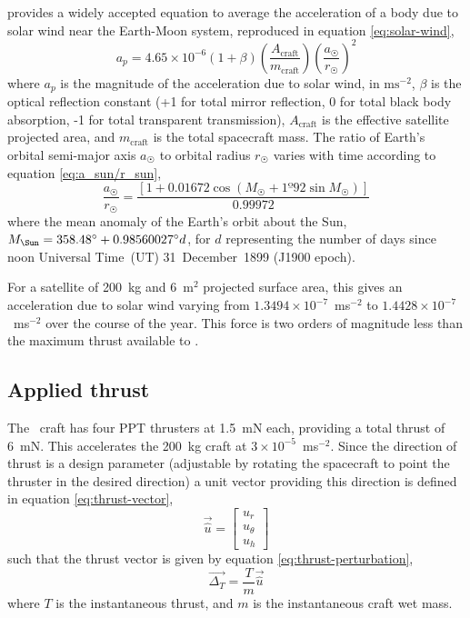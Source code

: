 \textcite[p. 223]{Chobotov2002} provides a widely accepted equation to average the acceleration
 of a body due to solar wind near the Earth-Moon system, reproduced in equation \eqref{eq:solar-wind},
\begin{equation}\label{eq:solar-wind}
a_{p}=4.65\times10^{-6}(1+\beta)\left(\frac{A_{\text{craft}}}{m_{\text{craft}}}\right)\left(\frac{a_\Sun}{r_\Sun}\right)^{2}
\end{equation}
where $a_{p}$ is the magnitude of the acceleration due to solar wind, in $\text{ms}^{-2}$, $\beta$ is the optical reflection constant (+1 for total mirror reflection, 0 for total black body absorption, -1 for total transparent transmission), $A_{\text{craft}}$ is the effective satellite projected area, and $m_{\text{craft}}$ is the total spacecraft mass. The ratio of Earth's orbital semi-major axis $a_\Sun$ to orbital radius $r_\Sun$ varies with time according to equation \eqref{eq:a_sun/r_sun},
\begin{equation}\label{eq:a_sun/r_sun}
\frac{a_\Sun}{r_\Sun}=\frac{[1+0.01672\cos(M_\Sun+1º92\sin M_\Sun)]}{0.99972}
\end{equation}
where the mean anomaly of the Earth's orbit about the Sun, $M_\Sun=358.48\degrees+0.98560027\degrees d$, for $d$ representing the number of days since noon Universal Time~(UT) 31~December~1899 (J1900 epoch).

For a satellite of 200~kg and 6~m$^2$ projected surface area, this gives an acceleration due to solar wind varying from $1.3494\times10^{-7}$~ms$^{-2}$ to $1.4428\times10^{-7}$~ms$^{-2}$ over the course of the year. This force is two orders of magnitude less than the maximum thrust available to \BW.




\subsection{Applied thrust} \label{sub:Applied-Thrust}

The \BW\ craft has four PPT thrusters at 1.5~mN each, providing a total thrust of 6~mN. This accelerates the 200~kg craft at $3\times10^{-5}$~ms$^{-2}$. Since the direction of thrust is a design parameter (adjustable by rotating the spacecraft to point the thruster in the desired direction) a unit vector providing this direction is defined in equation \eqref{eq:thrust-vector},
\begin{equation} \label{eq:thrust-vector}
\vec{\hat{u}}=\left[\begin{array}{c}
u_{r}\\
u_{\theta}\\
u_{h}
\end{array}\right]
\end{equation}
such that the thrust vector is given by equation \eqref{eq:thrust-perturbation},
\begin{equation}
\vec{\Delta_{T}}=\frac{T}{m}\vec{\hat{u}} \label{eq:thrust-perturbation}
\end{equation}
where $T$ is the instantaneous thrust, and $m$ is the instantaneous craft wet mass.

